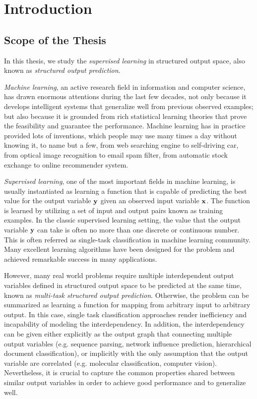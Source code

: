 





\chapter{Introduction}\label{ch_introduction}

\section{Scope of the Thesis}

In this thesis, we study the \textit{supervised learning} in structured output space, also known as \textit{structured output prediction}.

\textit{Machine learning}, an active research field in information and computer science, has drawn enormous attentions during the last few decades, not only because it develops intelligent systems that generalize well from previous observed examples; but also because it is grounded from rich statistical learning theories that prove the feasibility and guarantee the performance.
Machine learning has in practice provided lots of inventions, which people may use many times a day without knowing it, to name but a few, from web searching engine to self-driving car, from optical image recognition to email spam filter, from automatic stock exchange to online recommender system.

\textit{Supervised learning}, one of the most important fields in {machine learning}, is usually instantiated as learning a function that is capable of predicting the best value for the output variable $\mathbf {y}$ given an observed input variable $\mathbf {x}$.
The function is learned by utilizing a set of input and output pairs known as training examples.
In the classic supervised learning setting, the value that the output variable $\mathbf {y}$ can take is often no more than one discrete or continuous number.
This is often referred as single-task classification in machine learning community.
Many excellent learning algorithms have been designed for the problem and achieved remarkable success in many applications.

However, many real world problems require multiple interdependent output variables defined in structured output space to be predicted at the same time, known as \textit{multi-task structured output prediction}.
Otherwise, the problem can be summarized as learning a function for mapping from arbitrary input to arbitrary output.
In this case, single task classification approaches render inefficiency and incapability of modeling the interdependency.
In addition, the interdependency can be given either explicitly as the output graph that connecting multiple output variables (e.g. sequence parsing, network influence prediction, hierarchical document classification), or implicitly with the only assumption that the output variable are correlated (e.g. molecular classification, computer vision).
Nevertheless, it is crucial to capture the common properties shared between similar output variables in order to achieve good performance and to generalize well.

